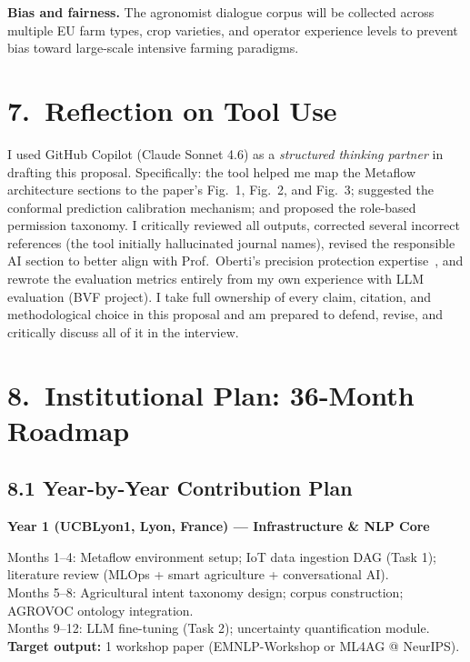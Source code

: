\documentclass[11pt,a4paper]{article}
\begin{document}
\textbf{Bias and fairness.} The agronomist dialogue corpus will be collected across
multiple EU farm types, crop varieties, and operator experience levels to prevent
bias toward large-scale intensive farming paradigms.

\section{7.\ Reflection on Tool Use}

I used GitHub Copilot (Claude Sonnet 4.6) as a \emph{structured thinking partner} in drafting
this proposal. Specifically: the tool helped me map the Metaflow architecture sections to
the paper's Fig.~1, Fig.~2, and Fig.~3; suggested the conformal prediction calibration
mechanism; and proposed the role-based permission taxonomy. I critically reviewed all outputs,
corrected several incorrect references (the tool initially hallucinated journal names), revised
the responsible AI section to better align with Prof.\ Oberti's precision protection
expertise~\cite{oberti_2025}, and rewrote the evaluation metrics entirely from my own experience
with LLM evaluation (BVF project). I take full ownership of every claim, citation, and
methodological choice in this proposal and am prepared to defend, revise, and critically discuss
all of it in the interview.

\section{8.\ Institutional Plan: 36-Month Roadmap}

\subsection{8.1 Year-by-Year Contribution Plan}

\textbf{Year 1 (UCBLyon1, Lyon, France) — Infrastructure \& NLP Core}

\noindent Months 1--4: Metaflow environment setup; IoT data ingestion DAG (Task 1);
literature review (MLOps + smart agriculture + conversational AI).\\
Months 5--8: Agricultural intent taxonomy design; corpus construction; AGROVOC ontology integration.\\
Months 9--12: LLM fine-tuning (Task 2); uncertainty quantification module.\\
\textbf{Target output:} 1 workshop paper (EMNLP-Workshop or ML4AG @ NeurIPS).
\end{document}
